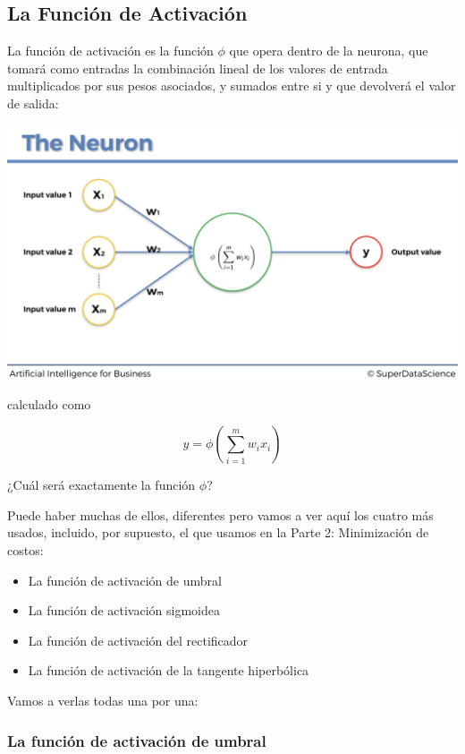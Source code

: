 \documentclass[]{book}
\providecommand{\tightlist}{%
  \setlength{\itemsep}{0pt}\setlength{\parskip}{0pt}}
\begin{document}
\hypertarget{la-funciuxf3n-de-activaciuxf3n}{%
\subsection{La Función de Activación}\label{la-funciuxf3n-de-activaciuxf3n}}

La función de activación es la función \(\phi\) que opera dentro de la neurona, que tomará como entradas la combinación lineal de los valores de entrada multiplicados por sus pesos asociados, y sumados entre si y que devolverá el valor de salida:

\includegraphics{Images/ANN_9.png}

calculado como

\[y = \phi\left( \sum_{i=1}^m w_i x_i \right)\]

¿Cuál será exactamente la función \(\phi\)?

Puede haber muchas de ellos, diferentes pero vamos a ver aquí los cuatro más usados, incluido, por supuesto, el que usamos en la Parte 2: Minimización de costos:

\begin{itemize}
\tightlist
\item
  La función de activación de umbral
\item
  La función de activación sigmoidea
\item
  La función de activación del rectificador
\item
  La función de activación de la tangente hiperbólica
\end{itemize}

Vamos a verlas todas una por una:

\hypertarget{la-funciuxf3n-de-activaciuxf3n-de-umbral}{%
\subsubsection{La función de activación de umbral}\label{la-funciuxf3n-de-activaciuxf3n-de-umbral}}
\end{document}
